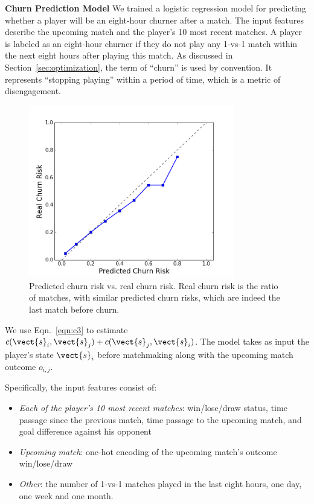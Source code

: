 \textbf{Churn Prediction Model} We trained a logistic regression model for predicting whether a player will be an eight-hour churner after a match. The input features describe the upcoming match and the player's 10 most recent matches. A player is labeled as an eight-hour churner if they do not play any 1-vs-1 match within the next eight hours after playing this match. As discussed in Section~\ref{sec:optimization}, the term of ``churn'' is used by convention. It represents ``stopping playing'' within a period of time, which is a metric of disengagement.

\begin{figure}[t]
\centering
\includegraphics[width=0.8\textwidth]{Figures/prob_calib_lr_line.png}
\caption{Predicted churn risk vs. real churn risk. Real churn risk is the ratio of matches, with similar predicted churn risks, which are indeed the last match before churn. }
\label{fig:lr_cali}
\end{figure}

We use Eqn.~\ref{eqn:c3} to estimate $c(\vect{s}_i, \vect{s}_j) + c(\vect{s}_j, \vect{s}_i)$. The model takes as input the player's state $\vect{s}_i$ before matchmaking along with the upcoming match outcome $o_{i, j}$.

Specifically, the input features consist of:
\begin{itemize}
\item \textit{Each of the player's 10 most recent matches}: win/lose/draw status, time passage since the previous match, time passage to the upcoming match, and goal difference against his opponent
\item \textit{Upcoming match}: one-hot encoding of the upcoming match's outcome win/lose/draw
\item \textit{Other}: the number of 1-vs-1 matches played in the last eight hours, one day, one week and one month.
\end{itemize}

